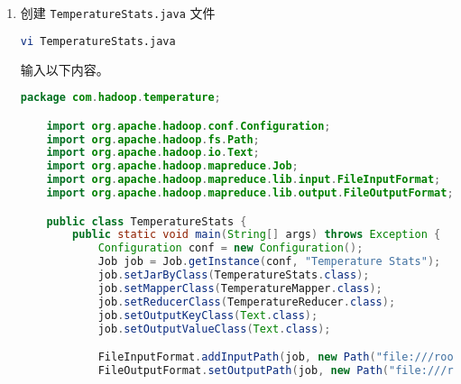\documentclass{article}
\newenvironment{enum}{
    \begin{enumerate}[label=(\arabic*), noitemsep]
}{
    \end{enumerate}
}
\begin{document}
\begin{enum}
\begin{lstlisting}[language=java]
            for (Text value : values) {
                records.add(value.toString());
            }

            Collections.sort(records, new Comparator<String>() {
                @Override
                public int compare(String o1, String o2) {
                    int temp1 = Integer.parseInt(o1.split("\\s+")[2]);
                    int temp2 = Integer.parseInt(o2.split("\\s+")[2]);
                    return Integer.compare(temp1, temp2);
                }
            });

            Text outputValue = new Text();

            int limit = Math.min(2, records.size());
            for (int i = 0; i < limit; i++) {
                outputValue.set(records.get(i));
                context.write(null, outputValue);
            }
        }
    }
    \end{lstlisting}
    
    \item 创建 \texttt{TemperatureStats.java} 文件
    
    \begin{lstlisting}[language=bash]
    vi TemperatureStats.java
    \end{lstlisting}
    
    输入以下内容。
    
    \begin{lstlisting}[language=java]
    package com.hadoop.temperature;

    import org.apache.hadoop.conf.Configuration;
    import org.apache.hadoop.fs.Path;
    import org.apache.hadoop.io.Text;
    import org.apache.hadoop.mapreduce.Job;
    import org.apache.hadoop.mapreduce.lib.input.FileInputFormat;
    import org.apache.hadoop.mapreduce.lib.output.FileOutputFormat;

    public class TemperatureStats {
        public static void main(String[] args) throws Exception {
            Configuration conf = new Configuration();
            Job job = Job.getInstance(conf, "Temperature Stats");
            job.setJarByClass(TemperatureStats.class);
            job.setMapperClass(TemperatureMapper.class);
            job.setReducerClass(TemperatureReducer.class);
            job.setOutputKeyClass(Text.class);
            job.setOutputValueClass(Text.class);

            FileInputFormat.addInputPath(job, new Path("file:///root/app/workspace/TemperatureStats/temperature.txt"));
            FileOutputFormat.setOutputPath(job, new Path("file:///root/app/workspace/TemperatureStats/out"));


\end{lstlisting}
\end{enum}
\end{document}
